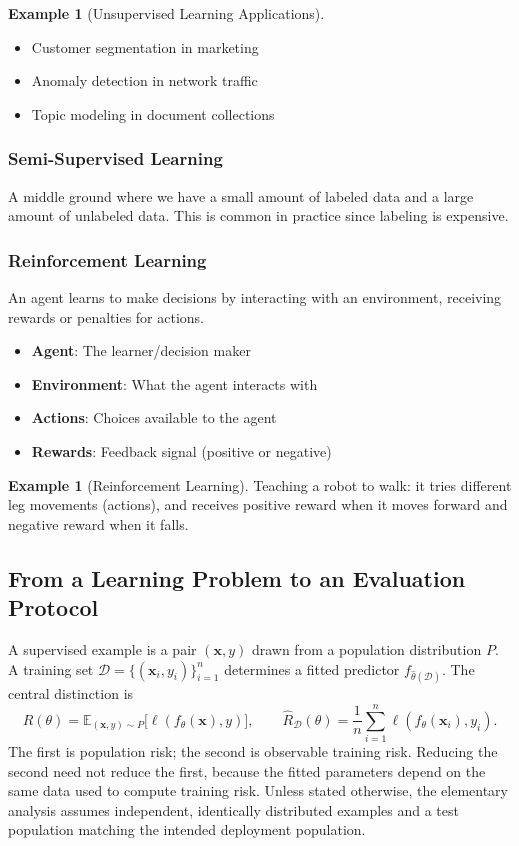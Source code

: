 \documentclass[11pt,twoside]{article}
\numberwithin{equation}{section}
\newcommand{\E}{\mathbb{E}}
\newcommand{\vect}[1]{\bm{#1}}
\theoremstyle{plain}
\theoremstyle{definition}
\newtheorem{example}[theorem]{Example}
\theoremstyle{remark}
\begin{document}
\begin{example}[Unsupervised Learning Applications]
\begin{itemize}
\item Customer segmentation in marketing
\item Anomaly detection in network traffic
\item Topic modeling in document collections
\end{itemize}
\end{example}

\subsubsection{Semi-Supervised Learning}

A middle ground where we have a small amount of labeled data and a large amount of unlabeled data. This is common in practice since labeling is expensive.

\subsubsection{Reinforcement Learning}

An agent learns to make decisions by interacting with an environment, receiving rewards or penalties for actions.

\begin{itemize}
\item \textbf{Agent}: The learner/decision maker
\item \textbf{Environment}: What the agent interacts with
\item \textbf{Actions}: Choices available to the agent
\item \textbf{Rewards}: Feedback signal (positive or negative)
\end{itemize}

\begin{example}[Reinforcement Learning]
Teaching a robot to walk: it tries different leg movements (actions), and receives positive reward when it moves forward and negative reward when it falls.
\end{example}

\subsection{From a Learning Problem to an Evaluation Protocol}
\label{sec:learning-protocol}
A supervised example is a pair $(\vect{x},y)$ drawn from a population distribution $P$. A training set $\mathcal D=\{(\vect{x}_i,y_i)\}_{i=1}^n$ determines a fitted predictor $f_{\hat\theta(\mathcal D)}$. The central distinction is
\[
R(\theta)=\E_{(\vect{x},y)\sim P}\bigl[\ell(f_\theta(\vect{x}),y)\bigr],
\qquad
\widehat R_{\mathcal D}(\theta)=\frac1n\sum_{i=1}^n\ell(f_\theta(\vect{x}_i),y_i).
\]
The first is population risk; the second is observable training risk. Reducing the second need not reduce the first, because the fitted parameters depend on the same data used to compute training risk. Unless stated otherwise, the elementary analysis assumes independent, identically distributed examples and a test population matching the intended deployment population.
\end{document}
